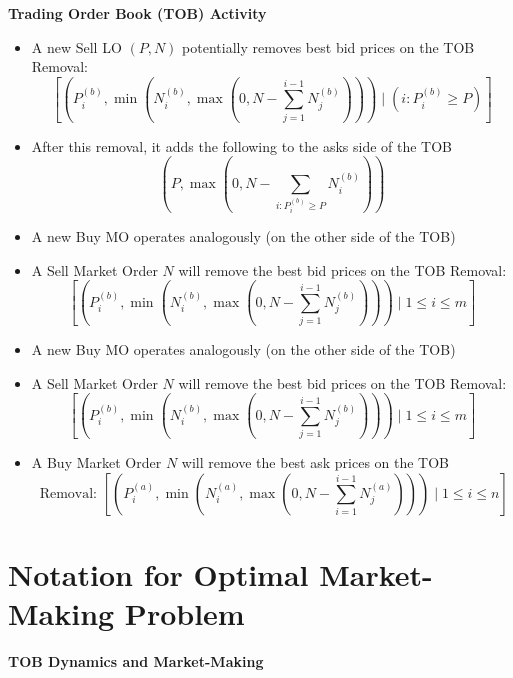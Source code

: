 \documentclass[10pt]{article}
\begin{document}
\textbf{Trading Order Book (TOB) Activity}

\begin{itemize} 
    \item A new Sell LO $(P, N)$ potentially removes best bid prices on the TOB Removal: 
    $$
    \left[\left(P_{i}^{(b)}, \min \left(N_{i}^{(b)}, \max \left(0, N-\sum_{j=1}^{i-1} N_{j}^{(b)}\right)\right)\right) \mid\left(i: P_{i}^{(b)} \geq P\right)\right]
    $$
    \item After this removal, it adds the following to the asks side of the TOB
    $$
    \left(P, \max \left(0, N-\sum_{i: P_{i}^{(b)} \geq P} N_{i}^{(b)}\right)\right)
    $$
    \item A new Buy MO operates analogously (on the other side of the TOB)
    \item A Sell Market Order $N$ will remove the best bid prices on the TOB Removal: 
    $$
    \left[\left(P_{i}^{(b)}, \min \left(N_{i}^{(b)}, \max \left(0, N-\sum_{j=1}^{i-1} N_{j}^{(b)}\right)\right)\right) \mid 1 \leq i \leq m\right]
    $$
    \item A new Buy MO operates analogously (on the other side of the TOB)
    \item A Sell Market Order $N$ will remove the best bid prices on the TOB Removal: 
    $$
    \left[\left(P_{i}^{(b)}, \min \left(N_{i}^{(b)}, \max \left(0, N-\sum_{j=1}^{i-1} N_{j}^{(b)}\right)\right)\right) \mid 1 \leq i \leq m\right]
    $$
    \item A Buy Market Order $N$ will remove the best ask prices on the TOB
    $$
    \text { Removal: }\left[\left(P_{i}^{(a)}, \min \left(N_{i}^{(a)}, \max \left(0, N-\sum_{i=1}^{i-1} N_{j}^{(a)}\right)\right)\right) \mid 1 \leq i \leq n\right]
    $$
    
\end{itemize}

\section{Notation for Optimal Market-Making Problem}

\textbf{TOB Dynamics and Market-Making}
\end{document}
